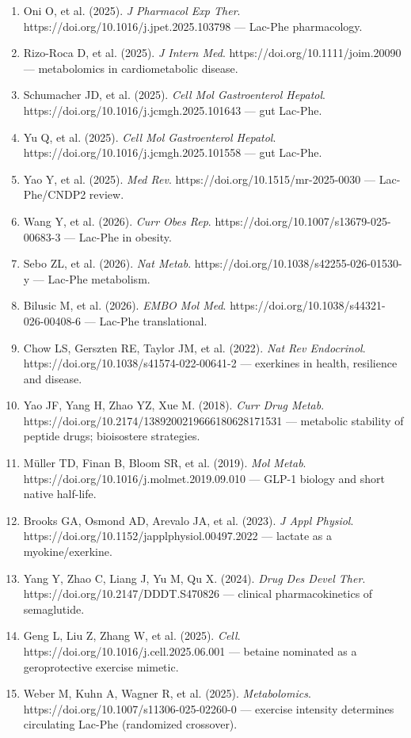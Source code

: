 \documentclass[11pt]{article}
\begin{document}
\begin{enumerate}
\item Oni O, et al. (2025). \textit{J Pharmacol Exp Ther}. https://doi.org/10.1016/j.jpet.2025.103798 --- Lac-Phe pharmacology.
\item Rizo-Roca D, et al. (2025). \textit{J Intern Med}. https://doi.org/10.1111/joim.20090 --- metabolomics in cardiometabolic disease.
\item Schumacher JD, et al. (2025). \textit{Cell Mol Gastroenterol Hepatol}. https://doi.org/10.1016/j.jcmgh.2025.101643 --- gut Lac-Phe.
\item Yu Q, et al. (2025). \textit{Cell Mol Gastroenterol Hepatol}. https://doi.org/10.1016/j.jcmgh.2025.101558 --- gut Lac-Phe.
\item Yao Y, et al. (2025). \textit{Med Rev}. https://doi.org/10.1515/mr-2025-0030 --- Lac-Phe/CNDP2 review.
\item Wang Y, et al. (2026). \textit{Curr Obes Rep}. https://doi.org/10.1007/s13679-025-00683-3 --- Lac-Phe in obesity.
\item Sebo ZL, et al. (2026). \textit{Nat Metab}. https://doi.org/10.1038/s42255-026-01530-y --- Lac-Phe metabolism.
\item Bilusic M, et al. (2026). \textit{EMBO Mol Med}. https://doi.org/10.1038/s44321-026-00408-6 --- Lac-Phe translational.
\item Chow LS, Gerszten RE, Taylor JM, et al. (2022). \textit{Nat Rev Endocrinol}. https://doi.org/10.1038/s41574-022-00641-2 --- exerkines in health, resilience and disease.
\item Yao JF, Yang H, Zhao YZ, Xue M. (2018). \textit{Curr Drug Metab}. https://doi.org/10.2174/1389200219666180628171531 --- metabolic stability of peptide drugs; bioisostere strategies.
\item M\"uller TD, Finan B, Bloom SR, et al. (2019). \textit{Mol Metab}. https://doi.org/10.1016/j.molmet.2019.09.010 --- GLP-1 biology and short native half-life.
\item Brooks GA, Osmond AD, Arevalo JA, et al. (2023). \textit{J Appl Physiol}. https://doi.org/10.1152/japplphysiol.00497.2022 --- lactate as a myokine/exerkine.
\item Yang Y, Zhao C, Liang J, Yu M, Qu X. (2024). \textit{Drug Des Devel Ther}. https://doi.org/10.2147/DDDT.S470826 --- clinical pharmacokinetics of semaglutide.
\item Geng L, Liu Z, Zhang W, et al. (2025). \textit{Cell}. https://doi.org/10.1016/j.cell.2025.06.001 --- betaine nominated as a geroprotective exercise mimetic.
\item Weber M, Kuhn A, Wagner R, et al. (2025). \textit{Metabolomics}. https://doi.org/10.1007/s11306-025-02260-0 --- exercise intensity determines circulating Lac-Phe (randomized crossover).

\end{enumerate}
\end{document}

